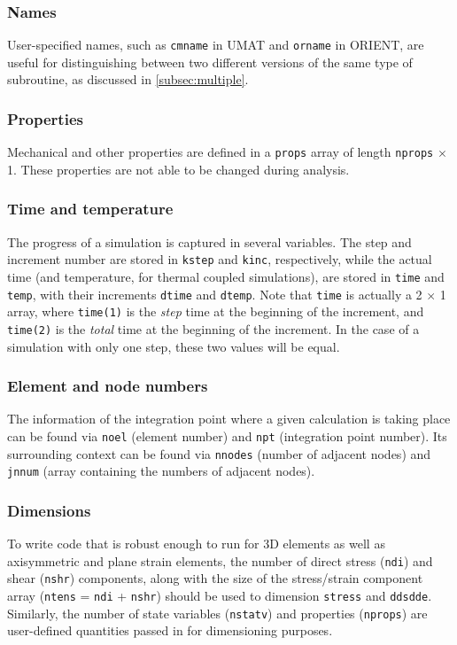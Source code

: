 \documentclass[10pt,letterpaper,oneside]{report}
\begin{document}
\subsubsection{Names}
User-specified names, such as \texttt{cmname} in UMAT and \texttt{orname} in ORIENT, are useful for distinguishing between two different versions of the same type of subroutine, as discussed in \autoref{subsec:multiple}.  

\subsubsection{Properties}
Mechanical and other properties are defined in a \texttt{props} array of length \texttt{nprops} $\times$ 1.  These properties are not able to be changed during analysis.

\subsubsection{Time and temperature}
The progress of a simulation is captured in several variables.  The step and increment number are stored in \texttt{kstep} and \texttt{kinc}, respectively, while the actual time (and temperature, for thermal coupled simulations), are stored in \texttt{time} and \texttt{temp}, with their increments \texttt{dtime} and \texttt{dtemp}.  Note that \texttt{time} is actually a 2 $\times$ 1 array, where \texttt{time(1)} is the \emph{step} time at the beginning of the increment, and \texttt{time(2)} is the \emph{total} time at the beginning of the increment.  In the case of a simulation with only one step, these two values will be equal. 

\subsubsection{Element and node numbers}
The information of the integration point where a given calculation is taking place can be found via \texttt{noel} (element number) and \texttt{npt} (integration point number).  Its surrounding context can be found via \texttt{nnodes} (number of adjacent nodes) and \texttt{jnnum} (array containing the numbers of adjacent nodes). 

\subsubsection{Dimensions}
To write code that is robust enough to run for 3D elements as well as axisymmetric and plane strain elements, the number of direct stress (\texttt{ndi}) and shear (\texttt{nshr}) components, along with the size of the stress/strain component array (\texttt{ntens} = \texttt{ndi} + \texttt{nshr}) should be used to dimension \texttt{stress} and \texttt{ddsdde}.  Similarly, the number of state variables (\texttt{nstatv}) and properties (\texttt{nprops}) are user-defined quantities passed in for dimensioning purposes.  
\end{document}
